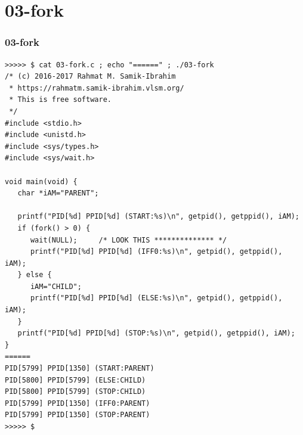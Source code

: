 \documentclass[aspectratio=169, xcolor=table, notheorems, hyperref={pdfpagelabels=false}]{beamer}
\begin{document}
\section{03-fork}
\begin{frame}[fragile]
\frametitle{03-fork}
\begin{lstlisting}[basicstyle=\ttfamily\tiny]
>>>>> $ cat 03-fork.c ; echo "======" ; ./03-fork 
/* (c) 2016-2017 Rahmat M. Samik-Ibrahim
 * https://rahmatm.samik-ibrahim.vlsm.org/
 * This is free software.
 */
#include <stdio.h>
#include <unistd.h>
#include <sys/types.h>
#include <sys/wait.h>

void main(void) {
   char *iAM="PARENT";
  
   printf("PID[%d] PPID[%d] (START:%s)\n", getpid(), getppid(), iAM);
   if (fork() > 0) {
      wait(NULL);     /* LOOK THIS ************** */
      printf("PID[%d] PPID[%d] (IFF0:%s)\n", getpid(), getppid(), iAM);
   } else {
      iAM="CHILD";
      printf("PID[%d] PPID[%d] (ELSE:%s)\n", getpid(), getppid(), iAM);
   }
   printf("PID[%d] PPID[%d] (STOP:%s)\n", getpid(), getppid(), iAM);
}
======
PID[5799] PPID[1350] (START:PARENT)
PID[5800] PPID[5799] (ELSE:CHILD)
PID[5800] PPID[5799] (STOP:CHILD)
PID[5799] PPID[1350] (IFF0:PARENT)
PID[5799] PPID[1350] (STOP:PARENT)
>>>>> $ 

\end{lstlisting}
\end{frame}

\end{document}
